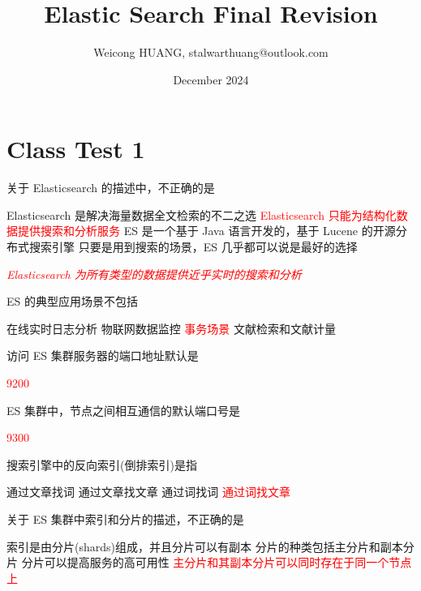 \documentclass{exam}
\title{Elastic Search Final Revision}
\author{Weicong HUANG, stalwarthuang@outlook.com}
\date{December 2024}
\begin{document}
\maketitle

\section{Class Test 1}

\begin{questions}

\question
关于 Elasticsearch 的描述中，不正确的是
\begin{choices}
    \choice Elasticsearch 是解决海量数据全文检索的不二之选
    \choice \textcolor{red}{Elasticsearch 只能为结构化数据提供搜索和分析服务}
    \choice ES 是一个基于 Java 语言开发的，基于 Lucene 的开源分布式搜索引擎
    \choice 只要是用到搜索的场景，ES 几乎都可以说是最好的选择
\end{choices}
\textit{\textcolor{red}{Elasticsearch 为所有类型的数据提供近乎实时的搜索和分析}}

\question
ES 的典型应用场景不包括
\begin{choices}
    \choice 在线实时日志分析
    \choice 物联网数据监控
    \choice \textcolor{red}{事务场景}
    \choice 文献检索和文献计量
\end{choices}

\question
访问 ES 集群服务器的端口地址默认是
\begin{choices}
    \choice \textcolor{red}{9200}
\end{choices}

\question
ES 集群中，节点之间相互通信的默认端口号是
\begin{choices}
    \choice \textcolor{red}{9300}
\end{choices}

\question
搜索引擎中的反向索引(倒排索引)是指
\begin{choices}
    \choice 通过文章找词
    \choice 通过文章找文章
    \choice 通过词找词
    \choice \textcolor{red}{通过词找文章}
\end{choices}

\question
关于 ES 集群中索引和分片的描述，不正确的是
\begin{choices}
    \choice 索引是由分片(shards)组成，并且分片可以有副本
    \choice 分片的种类包括主分片和副本分片
    \choice 分片可以提高服务的高可用性
    \choice \textcolor{red}{主分片和其副本分片可以同时存在于同一个节点上}
\end{choices}


\end{questions}
\end{document}
